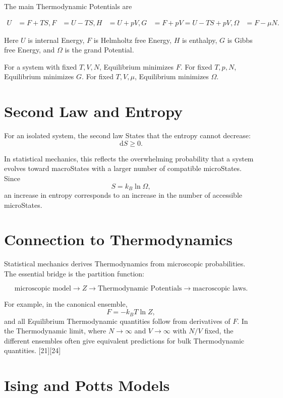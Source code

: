 \documentclass[a4paper, 10pt, onepage]{elegantbook}
\begin{document}
{The main Thermodynamic Potentials are

\begin{align}
U &= F+TS,
F &= U-TS,
H &= U+pV,
G &= F+pV=U-TS+pV,
\Omega &= F-\mu N.
\end{align}

Here \(U\) is internal Energy, \(F\) is Helmholtz free Energy, \(H\) is
enthalpy, \(G\) is Gibbs free Energy, and \(\Omega\) is the grand Potential.

For a system with fixed \(T,V,N\), Equilibrium minimizes \(F\). For fixed
\(T,p,N\), Equilibrium minimizes \(G\). For fixed \(T,V,\mu\), Equilibrium
minimizes \(\Omega\).

\section{Second Law and Entropy}

For an isolated system, the second law States that the entropy cannot decrease:
\[
\mathrm dS\ge 0.
\]

In statistical mechanics, this reflects the overwhelming probability that a
system evolves toward macroStates with a larger number of compatible
microStates. Since
\[
S=k_B\ln\Omega,
\]
an increase in entropy corresponds to an increase in the number of accessible
microStates.

\section{Connection to Thermodynamics}

Statistical mechanics derives Thermodynamics from microscopic probabilities.
The essential bridge is the partition function:

\[
\text{microscopic model}
\longrightarrow
Z
\longrightarrow
\text{Thermodynamic Potentials}
\longrightarrow
\text{macroscopic laws}.
\]

For example, in the canonical ensemble,
\[
F=-k_BT\ln Z,
\]
and all Equilibrium Thermodynamic quantities follow from derivatives of \(F\).
In the Thermodynamic limit, where \(N\to\infty\) and \(V\to\infty\) with
\(N/V\) fixed, the different ensembles often give equivalent predictions for
bulk Thermodynamic quantities. [21][24]

\newpage


\section{Ising and Potts Models}

}
\end{document}
